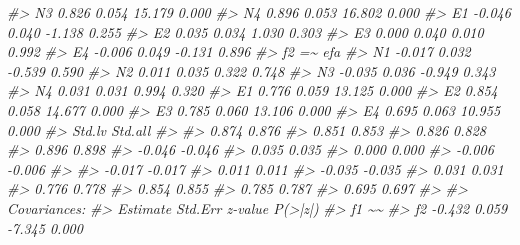 \documentclass[
  11pt,
]{krantz}
\makeatletter
\newenvironment{Shaded}{\begin{snugshade}}{\end{snugshade}}
\newcommand{\CommentTok}[1]{\textcolor[rgb]{0.37,0.37,0.37}{\textit{#1}}}
\newenvironment{kframe}{%
\medskip{}
\setlength{\fboxsep}{.8em}
 \def\at@end@of@kframe{}%
 \ifinner\ifhmode%
  \def\at@end@of@kframe{\end{minipage}}%
  \begin{minipage}{\columnwidth}%
 \fi\fi%
 \def\FrameCommand##1{\hskip\@totalleftmargin \hskip-\fboxsep
 \colorbox{shadecolor}{##1}\hskip-\fboxsep
     \hskip-\linewidth \hskip-\@totalleftmargin \hskip\columnwidth}%
 \MakeFramed {\advance\hsize-\width
   \@totalleftmargin\z@ \linewidth\hsize
   \@setminipage}}%
 {\par\unskip\endMakeFramed%
 \at@end@of@kframe}
\renewenvironment{Shaded}{\begin{kframe}}{\end{kframe}}
\theoremstyle{definition}
\theoremstyle{definition}
\theoremstyle{definition}
\theoremstyle{definition}
\theoremstyle{remark}
\makeatother
\begin{document}
\begin{Shaded}
\begin{Highlighting}[]
\CommentTok{\#\textgreater{}     N3                0.826    0.054   15.179    0.000}
\CommentTok{\#\textgreater{}     N4                0.896    0.053   16.802    0.000}
\CommentTok{\#\textgreater{}     E1               {-}0.046    0.040   {-}1.138    0.255}
\CommentTok{\#\textgreater{}     E2                0.035    0.034    1.030    0.303}
\CommentTok{\#\textgreater{}     E3                0.000    0.040    0.010    0.992}
\CommentTok{\#\textgreater{}     E4               {-}0.006    0.049   {-}0.131    0.896}
\CommentTok{\#\textgreater{}   f2 =\textasciitilde{} efa                                           }
\CommentTok{\#\textgreater{}     N1               {-}0.017    0.032   {-}0.539    0.590}
\CommentTok{\#\textgreater{}     N2                0.011    0.035    0.322    0.748}
\CommentTok{\#\textgreater{}     N3               {-}0.035    0.036   {-}0.949    0.343}
\CommentTok{\#\textgreater{}     N4                0.031    0.031    0.994    0.320}
\CommentTok{\#\textgreater{}     E1                0.776    0.059   13.125    0.000}
\CommentTok{\#\textgreater{}     E2                0.854    0.058   14.677    0.000}
\CommentTok{\#\textgreater{}     E3                0.785    0.060   13.106    0.000}
\CommentTok{\#\textgreater{}     E4                0.695    0.063   10.955    0.000}
\CommentTok{\#\textgreater{}    Std.lv  Std.all}
\CommentTok{\#\textgreater{}                   }
\CommentTok{\#\textgreater{}     0.874    0.876}
\CommentTok{\#\textgreater{}     0.851    0.853}
\CommentTok{\#\textgreater{}     0.826    0.828}
\CommentTok{\#\textgreater{}     0.896    0.898}
\CommentTok{\#\textgreater{}    {-}0.046   {-}0.046}
\CommentTok{\#\textgreater{}     0.035    0.035}
\CommentTok{\#\textgreater{}     0.000    0.000}
\CommentTok{\#\textgreater{}    {-}0.006   {-}0.006}
\CommentTok{\#\textgreater{}                   }
\CommentTok{\#\textgreater{}    {-}0.017   {-}0.017}
\CommentTok{\#\textgreater{}     0.011    0.011}
\CommentTok{\#\textgreater{}    {-}0.035   {-}0.035}
\CommentTok{\#\textgreater{}     0.031    0.031}
\CommentTok{\#\textgreater{}     0.776    0.778}
\CommentTok{\#\textgreater{}     0.854    0.855}
\CommentTok{\#\textgreater{}     0.785    0.787}
\CommentTok{\#\textgreater{}     0.695    0.697}
\CommentTok{\#\textgreater{} }
\CommentTok{\#\textgreater{} Covariances:}
\CommentTok{\#\textgreater{}                    Estimate  Std.Err  z{-}value  P(\textgreater{}|z|)}
\CommentTok{\#\textgreater{}   f1 \textasciitilde{}\textasciitilde{}                                               }
\CommentTok{\#\textgreater{}     f2               {-}0.432    0.059   {-}7.345    0.000}

\end{Highlighting}
\end{Shaded}
\end{document}
